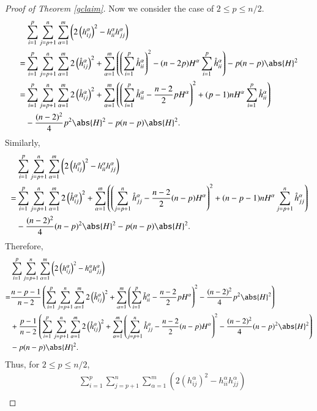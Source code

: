 \documentclass[12pt]{amsart}
\theoremstyle{plain}
\theoremstyle{remark}
\theoremstyle{definition}
\numberwithin{equation}{section}
\begin{document}
\begin{proof}[Proof of Theorem \ref{gclaim}]
Now we consider the case of $2\leq p\leq n/2$.
\begin{align*}
&\sum_{i=1}^p\sum_{j=p+1}^n\sum_{\alpha=1}^m\left(2\left(h_{ij}^{\alpha}\right)^2-h_{ii}^{\alpha}h_{jj}^{\alpha}\right)\\
=&\sum_{i=1}^p\sum_{j=p+1}^n\sum_{\alpha=1}^m2\left(\mathring{h}_{ij}^{\alpha}\right)^2+\sum_{\alpha=1}^m\left(\left(\sum_{i=1}^p\mathring{h}^{\alpha}_{ii}\right)^2-(n-2p)H^{\alpha}\sum_{i=1}^p\mathring{h}^{\alpha}_{ii}\right)-p(n-p)\abs{H}^2\\
=&\sum_{i=1}^p\sum_{j=p+1}^n\sum_{\alpha=1}^m2\left(\mathring{h}_{ij}^{\alpha}\right)^2+\sum_{\alpha=1}^m\left(\left(\sum_{i=1}^p\mathring{h}^{\alpha}_{ii}-\dfrac{n-2}{2}pH^{\alpha}\right)^2+(p-1)nH^{\alpha}\sum_{i=1}^p\mathring{h}^{\alpha}_{ii}\right)\\
&-\dfrac{(n-2)^2}{4}p^2\abs{H}^2-p(n-p)\abs{H}^2.
\end{align*}
Similarly,
\begin{align*}
&\sum_{i=1}^p\sum_{j=p+1}^n\sum_{\alpha=1}^m\left(2\left(h_{ij}^{\alpha}\right)^2-h_{ii}^{\alpha}h_{jj}^{\alpha}\right)\\
=&\sum_{i=1}^p\sum_{j=p+1}^n\sum_{\alpha=1}^m2\left(\mathring{h}_{ij}^{\alpha}\right)^2+\sum_{\alpha=1}^m\left(\left(\sum_{j=p+1}^n\mathring{h}^{\alpha}_{jj}-\dfrac{n-2}{2}(n-p)H^{\alpha}\right)^2+(n-p-1)nH^{\alpha}\sum_{j=p+1}^n\mathring{h}^{\alpha}_{jj}\right)\\
&-\dfrac{(n-2)^2}{4}(n-p)^2\abs{H}^2-p(n-p)\abs{H}^2.
\end{align*}
Therefore,
\begin{align*}
&\sum_{i=1}^p\sum_{j=p+1}^n\sum_{\alpha=1}^m\left(2\left(h_{ij}^{\alpha}\right)^2-h_{ii}^{\alpha}h_{jj}^{\alpha}\right)\\
=&\dfrac{n-p-1}{n-2}\left(\sum_{i=1}^p\sum_{j=p+1}^n\sum_{\alpha=1}^m2\left(\mathring{h}_{ij}^{\alpha}\right)^2+\sum_{\alpha=1}^m\left(\sum_{i=1}^p\mathring{h}^{\alpha}_{ii}-\dfrac{n-2}{2}pH^{\alpha}\right)^2-\dfrac{(n-2)^2}{4}p^2\abs{H}^2\right)\\
&+\dfrac{p-1}{n-2}\left(\sum_{i=1}^p\sum_{j=p+1}^n\sum_{\alpha=1}^m2\left(\mathring{h}_{ij}^{\alpha}\right)^2+\sum_{\alpha=1}^m\left(\sum_{j=p+1}^n\mathring{h}^{\alpha}_{jj}-\dfrac{n-2}{2}(n-p)H^{\alpha}\right)^2-\dfrac{(n-2)^2}{4}(n-p)^2\abs{H}^2\right)\\
&-p(n-p)\abs{H}^2.
\end{align*}
 Thus, for $2\leq p\leq n/2$,
\begin{align*}
&\sum_{i=1}^p\sum_{j=p+1}^n\sum_{\alpha=1}^m\left(2\left(h_{ij}^{\alpha}\right)^2-h_{ii}^{\alpha}h_{jj}^{\alpha}\right)\\

\end{align*}
\end{proof}
\end{document}
